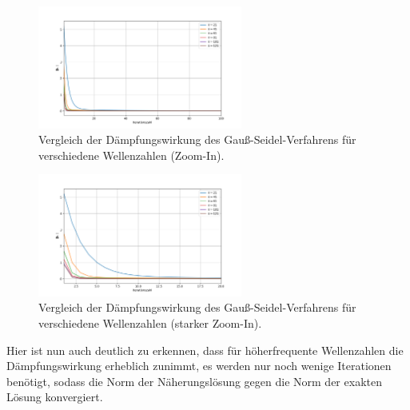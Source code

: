 \documentclass[11pt,a4paper]{article}
\begin{document}
\begin{figure}[htbp]
    \centering
    \includegraphics[width=0.6\textwidth,scale=0.7]{h1_comparison_plot_2}
    \caption[Vergleich der Dämpfungswirkung des Gauß-Seidel-Verfahrens für verschiedene Wellenzahlen (Zoom-In).]{Vergleich der Dämpfungswirkung des Gauß-Seidel-Verfahrens für verschiedene Wellenzahlen (Zoom-In).}\label{fig:h1_comparison_plot_2}
\end{figure}
\begin{figure}[htbp]
    \centering
    \includegraphics[width=0.6\textwidth,scale=0.7]{h1_comparison_plot_3}
    \caption[Vergleich der Dämpfungswirkung des Gauß-Seidel-Verfahrens für verschiedene Wellenzahlen (starker Zoom-In).]{Vergleich der Dämpfungswirkung des Gauß-Seidel-Verfahrens für verschiedene Wellenzahlen (starker Zoom-In).}\label{fig:h1_comparison_plot_3}
\end{figure} Hier ist nun auch deutlich zu erkennen, dass für höherfrequente Wellenzahlen die Dämpfungswirkung erheblich zunimmt, es werden nur noch wenige Iterationen benötigt, sodass die Norm der Näherungslösung gegen die Norm der exakten Lösung konvergiert.\newline
\end{document}
